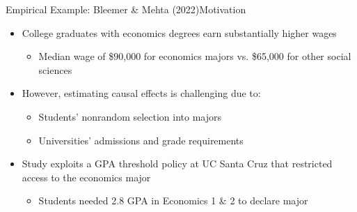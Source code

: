 \documentclass[dvipsnames,hyperref={pdfpagelabels=false}]{beamer}
\begin{document}
\begin{frame}{Empirical Example: Bleemer \& Mehta (2022)}{Motivation}
	\begin{itemize}
		\item College graduates with economics degrees earn substantially higher wages
		\vspace{0.2cm}
		\begin{itemize}
			\item Median wage of \$90,000 for economics majors vs. \$65,000 for other social sciences
		\end{itemize}
		
		\vspace{0.2cm}
		\item However, estimating causal effects is challenging due to:
					\vspace{0.2cm}
		\begin{itemize}
			\item Students' nonrandom selection into majors
			\vspace{0.2cm}
			\item Universities' admissions and grade requirements
		\end{itemize}
		
		\vspace{0.2cm}
		\item Study exploits a GPA threshold policy at UC Santa Cruz that restricted access to the economics major
		\begin{itemize}
						\vspace{0.2cm}
			\item Students needed 2.8 GPA in Economics 1 \& 2 to declare major
		\end{itemize}
		
	\end{itemize}
\end{frame}
\end{document}
